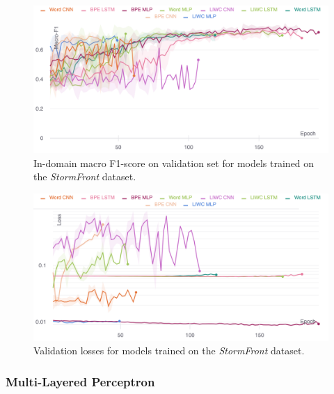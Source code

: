 \begin{figure}
    \centering
    \includegraphics[width=\textwidth]{garcia_dev_f1.pdf}
    \caption{In-domain macro F1-score on validation set for models trained on the \textit{StormFront} dataset.}
    \label{fig:garcia_dev_f1}
\end{figure}
\begin{figure}
    \centering
    \includegraphics[width=\textwidth]{garcia_dev_loss_stderr_logscale.pdf}
    \caption{Validation losses for models trained on the \textit{StormFront} dataset.}
    \label{fig:garcia_dev_loss}
\end{figure}

\subsubsection{Multi-Layered Perceptron}


